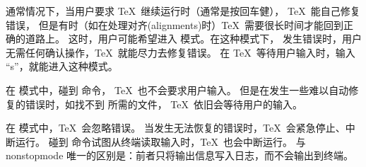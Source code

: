 \documentclass{book}
\begin{document}
通常情况下，当用户要求 \TeX\ 继续运行时（通常是按回车健），
\TeX\ 能自己修复错误，
但是有时（如在处理对齐(alignments)时）\TeX\ 需要很长时间才能回到正确的道路上。
这时，用户可能希望进入  模式。在这种模式下，
发生错误时，用户无需任何确认操作，\TeX\ 就能尽力去修复错误。
在 \TeX\ 等待用户输入时，输入 “s”，就能进入这种模式。

在  模式中，碰到  命令，
\TeX\ 也不会要求用户输入。
\alt
但是在发生一些难以自动修复的错误时，如找不到  所需的文件，
\TeX\ 依旧会等待用户的输入。

在  模式中，\TeX\ 会忽略错误。
当发生无法恢复的错误时，\TeX\ 会紧急停止、中断运行。
碰到  命令试图从终端读取输入时，\TeX\ 也会中断运行。
 与 nonstopmode 唯一的区别是：前者只将输出信息写入日志，而不会输出到终端。

{}
\endofchapter
\end{document}
